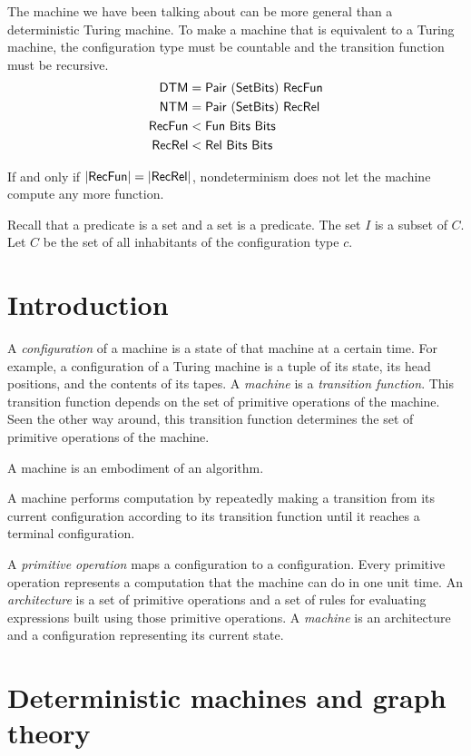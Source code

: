 The machine we have been talking about
can be more general than a deterministic Turing machine.
To make a machine that is equivalent to a Turing machine,
the configuration type must be countable
and the transition function must be recursive.
\begin{align*}
    \mathsf{DTM} &= \mathsf{Pair}~(\textsf{Set}{\textsf{Bits}})~\mathsf{RecFun}
    \\
    \mathsf{NTM} &= \mathsf{Pair}~(\textsf{Set}{\textsf{Bits}})~\mathsf{RecRel}
    \\
    \mathsf{RecFun} &< \mathsf{Fun}~\textsf{Bits}~\textsf{Bits}
    \\
    \mathsf{RecRel} &< \mathsf{Rel}~\textsf{Bits}~\textsf{Bits}
\end{align*}

If and only if $|\mathsf{RecFun}| = |\mathsf{RecRel}|$,
nondeterminism does not let the machine compute any more function.

Recall that a predicate is a set and a set is a predicate.
The set $I$ is a subset of $C$.
Let $C$ be the set of all inhabitants of the configuration type $c$.

\section{Introduction}

A \emph{configuration} of a machine is a state of that machine at a certain time.
For example, a configuration of a Turing machine is a tuple of its state,
its head positions, and the contents of its tapes.
A \emph{machine} is a \emph{transition function}.
This transition function depends on the set of primitive operations of the machine.
Seen the other way around, this transition function
determines the set of primitive operations of the machine.

A machine is an embodiment of an algorithm.

A machine performs computation by repeatedly
making a transition from its current configuration
according to its transition function
until it reaches a terminal configuration.

A \emph{primitive operation} maps a configuration to a configuration.
Every primitive operation represents a computation that the machine can do in one unit time.
An \emph{architecture} is a set of primitive operations
and a set of rules for evaluating expressions built using those primitive operations.
A \emph{machine} is an architecture and a configuration representing its current state.

\section{Deterministic machines and graph theory}

